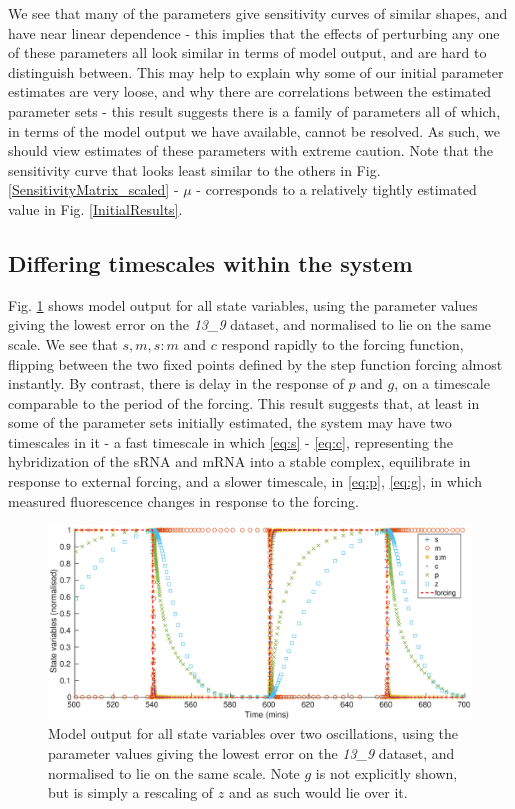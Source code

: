 \documentclass[10pt,journal]{./IEEE_latex_class/IEEEtran}
\begin{document}
We see that many of the parameters give sensitivity curves of similar shapes, and have near linear dependence - this implies that the effects of perturbing any one of these parameters all look similar in terms of model output, and are hard to distinguish between. This may help to explain why some of our initial parameter estimates are very loose, and why there are correlations between the estimated parameter sets - this result suggests there is a family of parameters all of which, in terms of the model output we have available, cannot be resolved. As such, we should view estimates of these parameters with extreme caution. Note that the sensitivity curve that looks least similar to the others in Fig. \ref{SensitivityMatrix_scaled} - $\mu$ - corresponds to a relatively tightly estimated value in Fig. \ref{InitialResults}.


 
\subsection{Differing timescales within the system}

Fig. \ref{model_output} shows model output for all state variables, using the parameter values giving the lowest error on the \textit{13\_9} dataset, and normalised to lie on the same scale. We see that $s,m,s:m$ and $c$ respond rapidly to the forcing function, flipping between the two fixed points defined by the step function forcing almost instantly. By contrast, there is delay in the response of $p$ and $g$, on a timescale comparable to the period of the forcing. This result suggests that, at least in some of the parameter sets initially estimated, the system may have two timescales in it - a fast timescale in which \eqref{eq:s} - \eqref{eq:c}, representing the hybridization of the sRNA and mRNA into a stable complex, equilibrate in response to external forcing, and a slower timescale, in \eqref{eq:p}, \eqref{eq:g}, in which measured fluorescence changes in response to the forcing.

\begin{figure}[h]	
    \centering
        \includegraphics[scale = 0.26,clip = true, trim = 90 0 60 0]{model_output}
        \caption{Model output for all state variables over two oscillations, using the parameter values giving the lowest error on the \textit{13\_9} dataset, and normalised to lie on the same scale. Note $g$ is not explicitly shown, but is simply a rescaling of $z$ and as such would lie over it. }
        \label{model_output} 
\end{figure}
\end{document}
